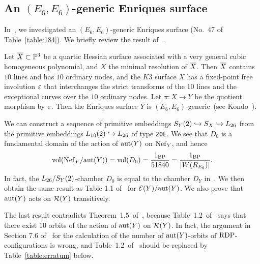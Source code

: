 \documentclass{amsart}
\numberwithin{procedure}{section}
\begin{document}
\subsection{An $(E_6, E_6)$-generic Enriques surface}\label{subsec:example47}
%
In~\cite{Shimada2019}, we  investigated 
an $(E_6, E_6)$-generic Enriques surface
(No.~47 of Table~\ref{table:184}).
We briefly review the result of~\cite{Shimada2019}.
\par
Let $\overline{X}\subset \mathord{\mathbb P}^3$ be a quartic Hessian surface
associated with a
very general cubic homogeneous polynomial,
and $X$ the minimal resolution of $\overline{X}$.
Then $\overline{X}$ contains $10$ lines and has $10$ ordinary nodes,
and the $K3$ surface $X$ has a fixed-point free involution $\varepsilon$
that interchanges the strict transforms of the $10$ lines
and the exceptional curves
over the $10$ ordinary nodes.
Let $\pi\colon X\to Y$ be the quotient morphism by
$\varepsilon$.
Then the Enriques surface $Y$ is
$(E_6, E_6)$-generic~(see Kondo~\cite{Kondo2012}).
\par
We can construct
a sequence of primitive
embeddings $S_{Y}(2)\hookrightarrow S_{X} \hookrightarrow L_{26}$
from the primitive embeddings $L_{10}(2) \hookrightarrow L_{26}$
of type {\tt 20E}.
We see that
$D_0$ is a fundamental domain of the action
of $\mathord{\rm{aut}}(Y)$ on $\mathord{\rm Nef}_Y$, and hence
\[
\mathord{\rm{vol}}(\mathord{\rm Nef}_{Y}/\mathord{\rm{aut}}(Y))=\mathord{\rm{vol}}(D_0)=\frac{1_{\mathord{\rm{BP}}}}{51840}=
\frac{1_{\mathord{\rm{BP}}}}{|W(R_{E_6})|}.
\]
In fact, the $L_{26}/S_Y(2)$-chamber  $D_0$ is equal to the chamber $D_Y$ in~\cite{Shimada2019}.
We then obtain the same result as Table 1.1 of~\cite{Shimada2019}
for $\mathord{\mathcal E}(Y)/\mathord{\rm{aut}}(Y)$.
We also prove that $\mathord{\rm{aut}}(Y)$ acts on $\mathord{\mathcal R}(Y)$ transitively.
\par
The last result contradicts Theorem~1.5~of~\cite{Shimada2019},
because Table~1.2~of~\cite{Shimada2019} says that
there exist  $10$
orbits of the action of $\mathord{\rm{aut}}(Y)$ on $\mathord{\mathcal R}(Y)$.
In fact, the argument in Section 7.6 of~\cite{Shimada2019} for
the calculation of the number of $\mathord{\rm{aut}}(Y)$-orbits
of $\mathord{\rm RDP}$-configurations  is wrong, and Table~1.2~of~\cite{Shimada2019}
should be replaced by Table~\ref{table:erratum} below.
%
\end{document}
